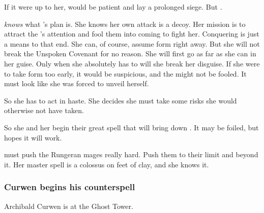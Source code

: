 If it were up to her, \Takestsha would be patient and lay a prolonged siege. 
But . 

\Takestsha \emph{knows} what \Secherdamon's plan is.
She knows her own attack is a decoy.
Her mission is to attract the \resphain's attention and fool them into coming to fight her. 
Conquering \Forclin is just a means to that end. 
She can, of course, assume \draconian form right away.
But she will not break the Unspoken Covenant for no reason.
She will first go as far as she can in her \human guise.
Only when she absolutely has to will she break her disguise.
If she were to take \draconian form too early, it would be suspicious, and the \resphain might not be fooled. 
It must look like she was forced to unveil herself. 

So she has to act in haste. 
She decides she must take some risks she would otherwise not have taken. 

So she and her \ishrah begin their great spell that will bring down \Forclin. 
It may be foiled, but \Takestsha hopes it will work. 

\Takestsha must push the Rungeran mages really hard. 
Push them to their limit and beyond it. 
Her master spell is a colossus on feet of clay, and she knows it. 






\subsubsection{Curwen begins his counterspell}
Archibald Curwen is at the Ghost Tower. 

